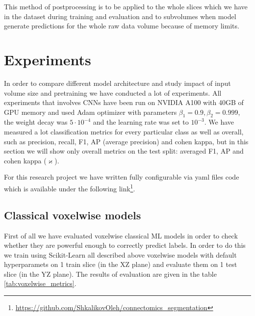 \documentclass[twocolumn, a4paper]{article}
\theoremstyle{definition}
\begin{document}
This method of postprocessing is to be applied to the whole slices which we have in the dataset during training and
evaluation and to subvolumes when model generate predictions for the whole raw data volume because of memory limits.

\section{Experiments}
In order to compare different model architecture and study impact of input volume size and pretraining we
have conducted a lot of experiments. All experiments that involves CNNs have been run on NVIDIA A100 with 40GB of GPU memory
and used Adam \cite{kingma2014adam} optimizer with parameters \( \beta_1=0.9, \beta_2=0.999 \), the weight decay was \( 5 \cdot 10^{-4} \)
and the learning rate was set to \( 10^{-3} \). We have measured a lot classification metrics for every
particular class as well as overall, such as precision, recall, F1, AP (average precision) and cohen kappa,
but in this section we will show only overall metrics on the test split: averaged F1, AP and cohen kappa (\(\varkappa\)).

For this research project we have written fully configurable via yaml files code which is available under the following
link\footnote{\url{https://github.com/ShkalikovOleh/connectomics_segmentation}}.

\subsection{Classical voxelwise models} \label{sec:voxelwise_expr}
First of all we have evaluated voxelwise classical ML models in order to check whether they are powerful enough to
correctly predict labels. In order to do this we train using Scikit-Learn \cite{scikit-learn} all described above
voxelwise models with default hyperparamets on 1 train slice (in the XZ plane)
and evaluate them on 1 test slice (in the YZ plane). The results of evaluation are given in the table
\ref{tab:voxelwise_metrics}.
\end{document}
